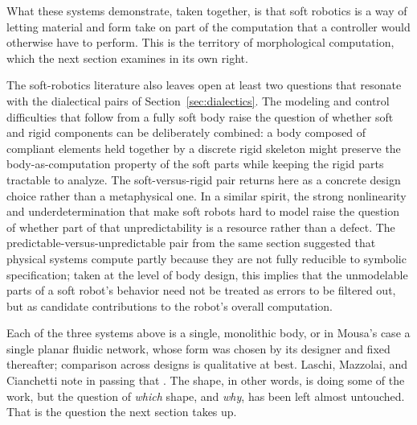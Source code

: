 What these systems demonstrate, taken together, is that soft robotics is a way of letting material and form take on part of the computation that a controller would otherwise have to perform. This is the territory of morphological computation, which the next section examines in its own right.

The soft-robotics literature also leaves open at least two questions that resonate with the dialectical pairs of Section~\ref{sec:dialectics}. The modeling and control difficulties that follow from a fully soft body raise the question of whether soft and rigid components can be deliberately combined: a body composed of compliant elements held together by a discrete rigid skeleton might preserve the body-as-computation property of the soft parts while keeping the rigid parts tractable to analyze. The soft-versus-rigid pair returns here as a concrete design choice rather than a metaphysical one. In a similar spirit, the strong nonlinearity and underdetermination that make soft robots hard to model raise the question of whether part of that unpredictability is a resource rather than a defect. The predictable-versus-unpredictable pair from the same section suggested that physical systems compute partly because they are not fully reducible to symbolic specification; taken at the level of body design, this implies that the unmodelable parts of a soft robot's behavior need not be treated as errors to be filtered out, but as candidate contributions to the robot's overall computation.

Each of the three systems above is a single, monolithic body, or in Mousa's case a single planar fluidic network, whose form was chosen by its designer and fixed thereafter; comparison across designs is qualitative at best. Laschi, Mazzolai, and Cianchetti note in passing that \cite{laschi_soft_2016}. The shape, in other words, is doing some of the work, but the question of \textit{which} shape, and \textit{why}, has been left almost untouched. That is the question the next section takes up.
